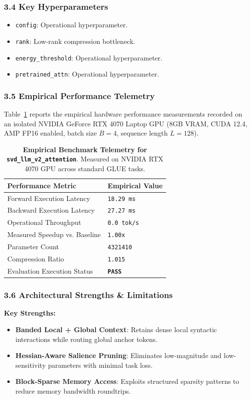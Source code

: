\subsubsection*{3.4 Key Hyperparameters}
\begin{itemize}
    \item \texttt{config}: Operational hyperparameter.
    \item \texttt{rank}: Low-rank compression bottleneck.
    \item \texttt{energy\_threshold}: Operational hyperparameter.
    \item \texttt{pretrained\_attn}: Operational hyperparameter.
\end{itemize}

\subsubsection*{3.5 Empirical Performance Telemetry}
Table~\ref{tab:telemetry_svd\_llm\_v2\_attention} reports the empirical hardware performance measurements recorded on an isolated NVIDIA GeForce RTX 4070 Laptop GPU (8GB VRAM, CUDA 12.4, AMP FP16 enabled, batch size $B=4$, sequence length $L=128$).

\begin{table}[h]
\centering
\small
\caption{\textbf{Empirical Benchmark Telemetry for \texttt{svd\_llm\_v2\_attention}}. Measured on NVIDIA RTX 4070 GPU across standard GLUE tasks.}
\label{tab:telemetry_svd\_llm\_v2\_attention}
\begin{tabularx}{\columnwidth}{lX}
\toprule
\textbf{Performance Metric} & \textbf{Empirical Value} \\
\midrule
Forward Execution Latency & \texttt{18.29 ms} \\
Backward Execution Latency & \texttt{27.27 ms} \\
Operational Throughput & \texttt{0.0 tok/s} \\
Measured Speedup vs. Baseline & \texttt{1.00x} \\
Parameter Count & \texttt{4321410} \\
Compression Ratio & \texttt{1.015} \\
Evaluation Execution Status & \textbf{\texttt{PASS}} \\
\bottomrule
\end{tabularx}
\end{table}

\subsubsection*{3.6 Architectural Strengths \& Limitations}
\textbf{Key Strengths:}
\begin{itemize}
    \item \textbf{Banded Local + Global Context}: Retains dense local syntactic interactions while routing global anchor tokens.
    \item \textbf{Hessian-Aware Salience Pruning}: Eliminates low-magnitude and low-sensitivity parameters with minimal task loss.
    \item \textbf{Block-Sparse Memory Access}: Exploits structured sparsity patterns to reduce memory bandwidth roundtrips.
\end{itemize}

